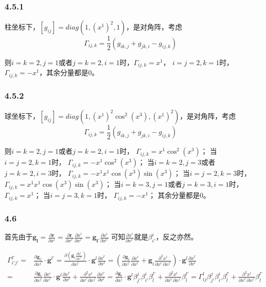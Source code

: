 \documentclass[UTF8,zihao=5]{ctexart}
\newcommand{\bm}[1]{{\mathbf{#1}}}
\newcommand*{\pd}[2]{\frac{\partial #1}{\partial #2}}
\newcommand*{\pdcd}[3]
{\frac{\partial^2 #1}{\partial #2 \partial #3}}
\begin{document}
\subsubsection*{4.5.1}
柱坐标下，$[g_{ij}]=diag(1, (x^1)^2, 1)$，是对角阵，考虑
$$
    \Gamma_{ij,k}=
    \frac{1}{2}
    (g_{ik,j} + g_{jk,i} - g_{ij,k})
$$

则$i=k=2,j=1$或者$j=k=2,i=1$时，$\Gamma_{ij,k}=x^1$，
$i=j=2,k=1$时，$\Gamma_{ij,k}=-x^1$，其余分量都是0。


\subsubsection*{4.5.2}
球坐标下，$[g_{ij}]=diag(1, (x^1)^2\cos^2(x^3), (x^1)^2)$，是对角阵，考虑
$$
    \Gamma_{ij,k}=
    \frac{1}{2}
    (g_{ik,j} + g_{jk,i} - g_{ij,k})
$$


则$i=k=2,j=1$或者$j=k=2,i=1$时，
$\Gamma_{ij,k}=x^1\cos^2(x^3)$；
当$i=j=2,k=1$时，
$\Gamma_{ij,k}=-x^1\cos^2(x^3)$；
当$i=k=2,j=3$或者$j=k=2,i=3$时，
$\Gamma_{ij,k}=-x^1x^1\cos(x^3)\sin(x^3)$；
当$i=j=2,k=3$时，
$\Gamma_{ij,k}=x^1x^1\cos(x^3)\sin(x^3)$；
当$i=k=3,j=1$或者$j=k=3,i=1$时，
$\Gamma_{ij,k}=x^1$；
当$i=j=3,k=1$时，
$\Gamma_{ij,k}=-x^1$；
其余分量都是0。



\subsubsection*{4.6}

首先由于$\bm{g_i}=\pd{\bm{r}}{x^i}=\pd{\bm{r}}{x^{i'}}\pd{x^i}{x^{i'}}=\bm{g_{i'}}\pd{x^i}{x^{i'}}$
可知$\pd{x^i}{x^{i'}}$就是$\beta^i_{i'}$，反之亦然。




$$
    \begin{aligned}
        \Gamma^{l'}_{i'j'}
        = & \pd{\bm{g}_{i'}}{x^{j'}}\cdot \bm{g}^{l'}
        =
        \pd{\left(\bm{g}_{i}\pd{x^i}{x^{i'}}\right)}{x^{j'}}
        \cdot\bm{g}^{l}\pd{x^{l'}}{x^{l}}
        =
        \left(
        \pd{\bm{g}_i}{x^{j'}}\pd{x^i}{x^{i'}}
        +
        \bm{g}_i\pdcd{x^i}{x^{i'}}{x^{j'}}
        \right)
        \cdot\bm{g}^{l}\pd{x^{l'}}{x^{l}}             \\
        = &
        \pd{\bm{g}_i}{x^{j'}}\pd{x^i}{x^{i'}}\cdot\bm{g}^{l}\pd{x^{l'}}{x^{l}}
        +\pdcd{x^l}{x^{i'}}{x^{j'}}\pd{x^{l'}}{x^{l}}
        =
        \pd{\bm{g}_i}{x^{j}}\cdot\bm{g}^{l}\beta^j_{j'}\beta^i_{i'}\beta^{l'}_l
        +\pdcd{x^l}{x^{i'}}{x^{j'}}\beta^{l'}_l
        =
        \Gamma^l_{ij}\beta^j_{j'}\beta^i_{i'}\beta^{l'}_l
        +\pdcd{x^l}{x^{i'}}{x^{j'}}\beta^{l'}_l
    \end{aligned}
$$
\end{document}
